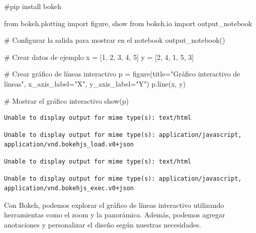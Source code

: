 \documentclass[
  a4paper,
]{article}
\newenvironment{Shaded}{}{}
\newcommand{\CommentTok}[1]{\textcolor[rgb]{0.42,0.45,0.49}{#1}}
\newcommand{\DecValTok}[1]{\textcolor[rgb]{0.00,0.36,0.77}{#1}}
\newcommand{\ImportTok}[1]{\textcolor[rgb]{0.01,0.18,0.38}{#1}}
\newcommand{\NormalTok}[1]{\textcolor[rgb]{0.14,0.16,0.18}{#1}}
\newcommand{\OperatorTok}[1]{\textcolor[rgb]{0.14,0.16,0.18}{#1}}
\newcommand{\StringTok}[1]{\textcolor[rgb]{0.01,0.18,0.38}{#1}}
\begin{document}
\begin{Shaded}
\begin{Highlighting}[]
\CommentTok{\#pip install bokeh}

\ImportTok{from}\NormalTok{ bokeh.plotting }\ImportTok{import}\NormalTok{ figure, show}
\ImportTok{from}\NormalTok{ bokeh.io }\ImportTok{import}\NormalTok{ output\_notebook}

\CommentTok{\# Configurar la salida para mostrar en el notebook}
\NormalTok{output\_notebook()}

\CommentTok{\# Crear datos de ejemplo}
\NormalTok{x }\OperatorTok{=}\NormalTok{ [}\DecValTok{1}\NormalTok{, }\DecValTok{2}\NormalTok{, }\DecValTok{3}\NormalTok{, }\DecValTok{4}\NormalTok{, }\DecValTok{5}\NormalTok{]}
\NormalTok{y }\OperatorTok{=}\NormalTok{ [}\DecValTok{2}\NormalTok{, }\DecValTok{4}\NormalTok{, }\DecValTok{1}\NormalTok{, }\DecValTok{5}\NormalTok{, }\DecValTok{3}\NormalTok{]}

\CommentTok{\# Crear gráfico de líneas interactivo}
\NormalTok{p }\OperatorTok{=}\NormalTok{ figure(title}\OperatorTok{=}\StringTok{"Gráfico interactivo de líneas"}\NormalTok{, x\_axis\_label}\OperatorTok{=}\StringTok{"X"}\NormalTok{, y\_axis\_label}\OperatorTok{=}\StringTok{"Y"}\NormalTok{)}
\NormalTok{p.line(x, y)}

\CommentTok{\# Mostrar el gráfico interactivo}
\NormalTok{show(p)}
\end{Highlighting}
\end{Shaded}

\begin{verbatim}
Unable to display output for mime type(s): text/html
\end{verbatim}

\begin{verbatim}
Unable to display output for mime type(s): application/javascript, application/vnd.bokehjs_load.v0+json
\end{verbatim}

\begin{verbatim}
Unable to display output for mime type(s): text/html
\end{verbatim}

\begin{verbatim}
Unable to display output for mime type(s): application/javascript, application/vnd.bokehjs_exec.v0+json
\end{verbatim}

Con Bokeh, podemos explorar el gráfico de líneas interactivo utilizando
herramientas como el zoom y la panorámica. Además, podemos agregar
anotaciones y personalizar el diseño según nuestras necesidades.
\end{document}
